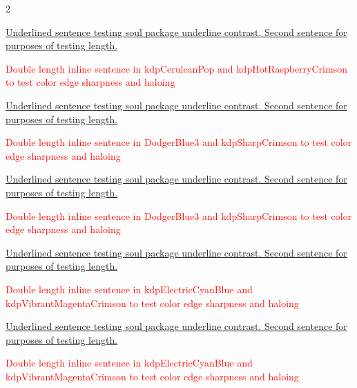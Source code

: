 \begin{multicols}{2}
\par\noindent\ul{Underlined sentence testing soul package underline contrast. Second sentence for purposes of testing length.}
\par\noindent\textcolor{Red}{Double length inline sentence in kdpCeruleanPop and kdpHotRaspberryCrimson to test color edge sharpness and haloing}
\clearpage
{}
\par\noindent\ul{Underlined sentence testing soul package underline contrast. Second sentence for purposes of testing length.}
\par\noindent\textcolor{Red}{Double length inline sentence in DodgerBlue3 and kdpSharpCrimson to test color edge sharpness and haloing}
\clearpage
{}
\par\noindent\ul{Underlined sentence testing soul package underline contrast. Second sentence for purposes of testing length.}
\par\noindent\textcolor{Red}{Double length inline sentence in DodgerBlue3 and kdpSharpCrimson to test color edge sharpness and haloing}
\clearpage
{}
\par\noindent\ul{Underlined sentence testing soul package underline contrast. Second sentence for purposes of testing length.}
\par\noindent\textcolor{Red}{Double length inline sentence in kdpElectricCyanBlue and kdpVibrantMagentaCrimson to test color edge sharpness and haloing}
\clearpage
{}
\par\noindent\ul{Underlined sentence testing soul package underline contrast. Second sentence for purposes of testing length.}
\par\noindent\textcolor{Red}{Double length inline sentence in kdpElectricCyanBlue and kdpVibrantMagentaCrimson to test color edge sharpness and haloing}
\clearpage



\end{multicols}
